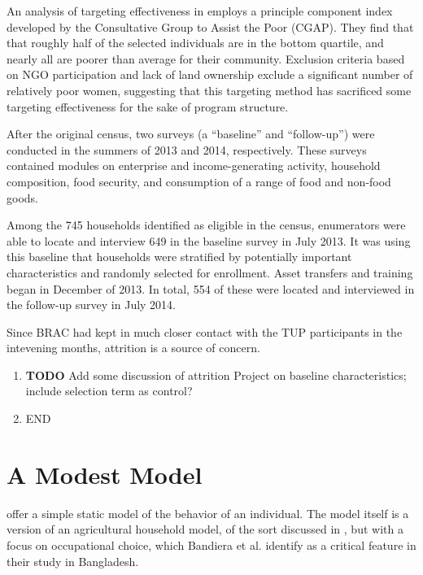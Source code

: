 \documentclass[12pt,letterpaper]{article}
\begin{document}
An analysis of targeting effectiveness in \cite{chowdhury-morel15}
employs a principle component index developed by the Consultative
Group to Assist the Poor (CGAP). They find that that roughly half of
the selected individuals are in the bottom quartile, and nearly all
are poorer than average for their community. Exclusion criteria
based on NGO participation and lack of land ownership exclude a
significant number of relatively poor women, suggesting that this
targeting method has sacrificed some targeting effectiveness for the
sake of program structure.

After the original census, two surveys (a ``baseline'' and
``follow-up'') were conducted in the summers of 2013 and 2014,
respectively.  These surveys contained modules on enterprise and
income-generating activity, household composition, food security,
and consumption of a range of food and non-food goods.

Among the 745 households identified as eligible in the census,
enumerators were able to locate and interview 649 in the baseline
survey in July 2013. It was using this baseline that households were stratified by
potentially important characteristics and randomly selected for enrollment. Asset
transfers and training began in December of 2013. In total, 554 of these were
located and interviewed in the follow-up survey in July 2014. 

Since BRAC had kept in much closer contact with the TUP participants in the
intevening months, attrition is a source of concern.

\begin{enumerate}
\item {\bfseries\sffamily TODO} Add some discussion of attrition
\label{sec:orgheadline6}
Project on baseline characteristics; include selection
term as control?
\item END
\label{sec:orgheadline7}
\end{enumerate}

\section{A Modest Model}
\label{sec:orgheadline10}

\cite{Bandiera-etal15} offer a simple static model of the behavior of
an individual.  The model itself is a version of an agricultural
household model, of the sort discussed in \cite{Singh-etal86}, but
with a focus on occupational choice, which Bandiera et al. identify as a 
critical feature in their study in Bangladesh.
\end{document}
